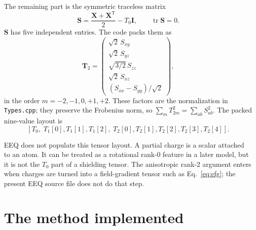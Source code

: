 \documentclass[11pt]{article}
\begin{document}
The remaining part is the symmetric traceless matrix
\begin{equation}
  \bm S =
  \frac{\bm X+\bm X^{\mathsf T}}{2}
  - T_0\bm I,\qquad \operatorname{tr}\bm S=0 .
  \label{eq:s}
\end{equation}
\(\bm S\) has five independent entries. The code packs them as
\begin{equation}
  \bm T_2 =
  \begin{pmatrix}
    \sqrt{2}\,S_{xy}\\
    \sqrt{2}\,S_{yz}\\
    \sqrt{3/2}\,S_{zz}\\
    \sqrt{2}\,S_{xz}\\
    (S_{xx}-S_{yy})/\sqrt{2}
  \end{pmatrix},
  \label{eq:t2}
\end{equation}
in the order \(m=-2,-1,0,+1,+2\). These factors are the normalization in
\texttt{Types.cpp}; they preserve the Frobenius norm, so
\(\sum_m T_{2m}^2=\sum_{ab}S_{ab}^2\). The packed nine-value layout is
\[
  [T_0,\;T_1[0],T_1[1],T_1[2],\;T_2[0],T_2[1],T_2[2],T_2[3],T_2[4]] .
\]

EEQ does not populate this tensor layout. A partial charge is a scalar attached
to an atom. It can be treated as a rotational rank-0 feature in a later model,
but it is not the \(T_0\) part of a shielding tensor. The anisotropic rank-2
argument enters when charges are turned into a field-gradient tensor such as
Eq.~\eqref{eq:efg}; the present EEQ source file does not do that step.

\section{The method implemented}
\end{document}
